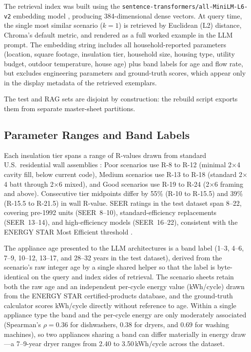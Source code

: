 \documentclass[11pt]{article}
\begin{document}
The retrieval index was built using the
\texttt{sentence-transformers/all-MiniLM-L6-v2} embedding model
\citep{reimers2019sentencebert}, producing 384-dimensional dense vectors.
At query time, the single most similar scenario ($k=1$) is retrieved by
Euclidean (L2) distance, Chroma's default metric, and rendered as a full worked example in the LLM prompt.
The embedding string includes all household-reported parameters (location,
square footage, insulation tier, household size, housing type, utility
budget, outdoor temperature, house age) plus band labels for age and flow
rate, but excludes engineering parameters and ground-truth scores, which
appear only in the display metadata of the retrieved exemplars.

The test and RAG sets are disjoint by construction: the rebuild script
exports them from separate master-sheet partitions.

\subsection{Parameter Ranges and Band Labels}
\label{app:parameter_ranges}

Each insulation tier spans a range of R-values drawn from standard U.S.\ residential wall assemblies \citep{cec_ja43_2013,energystar_insulation2023}: Poor scenarios use R-8 to R-12 (minimal 2$\times$4 cavity fill, below current code), Medium scenarios use R-13 to R-18 (standard 2$\times$4 batt through 2$\times$6 mixed), and Good scenarios use R-19 to R-24 (2$\times$6 framing and above). Consecutive tier midpoints differ by 55\% (R-10 to R-15.5) and 39\% (R-15.5 to R-21.5) in wall R-value. SEER ratings in the test dataset span 8--22, covering pre-1992 units (SEER~8--10), standard-efficiency replacements (SEER~13--14), and high-efficiency models (SEER~16--22), consistent with the ENERGY STAR Most Efficient threshold \citep{energystar_ac2023}.

The appliance age presented to the LLM architectures is a band label (1--3, 4--6, 7--9, 10--12, 13--17, and 28--32 years in the test dataset), derived from the scenario's raw integer age by a single shared helper so that the label is byte-identical on the query and index sides of retrieval. The scenario sheets retain both the raw age and an independent per-cycle energy value (kWh/cycle) drawn from the ENERGY STAR certified-products database, and the ground-truth calculator scores kWh/cycle directly without reference to age. Within a single appliance type the band and the per-cycle energy are only moderately associated (Spearman's $\rho = 0.36$ for dishwashers, $0.38$ for dryers, and $0.69$ for washing machines), so two appliances sharing a band can differ materially in energy draw---a 7--9-year dryer ranges from 2.40 to 3.50\,kWh/cycle across the dataset.
\end{document}
